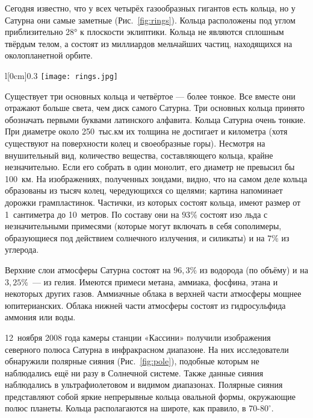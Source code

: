 \documentclass{article}
\begin{document}
    Сегодня известно, что у всех четырёх газообразных гигантов есть кольца, но у Сатурна они самые заметные (Рис.~\ref{fig:rings}). Кольца расположены под углом приблизительно 28° к плоскости эклиптики. Кольца не являются сплошным твёрдым телом, а состоят из миллиардов мельчайших частиц, находящихся на околопланетной орбите.\par
    \begin{wrapfigure}[14]{l}[0cm]{0.3\textwidth}
        \vspace{-0.5pc}
        \texttt{[image: rings.jpg]}
        \caption{}
        \label{fig:rings}
    \end{wrapfigure}
    Существует три основных кольца и четвёртое — более тонкое. Все вместе они отражают больше света, чем диск самого Сатурна. Три основных кольца принято обозначать первыми буквами латинского алфавита. Кольца Сатурна очень тонкие. При диаметре около 250~тыс.км их толщина не достигает и километра (хотя существуют на поверхности колец и своеобразные горы). Несмотря на внушительный вид, количество вещества, составляющего кольца, крайне незначительно. Если его собрать в один монолит, его диаметр не превысил бы 100~км. На изображениях, полученных зондами, видно, что на самом деле кольца образованы из тысяч колец, чередующихся со щелями; картина напоминает дорожки грампластинок. Частички, из которых состоят кольца, имеют размер от 1~сантиметра до 10~метров. По составу они на $93\%$ состоят изо льда с незначительными примесями (которые могут включать в себя сополимеры, образующиеся под действием солнечного излучения, и силикаты) и на $7\%$ из углерода.\par
    Верхние слои атмосферы Сатурна состоят на $96,3\%$ из водорода (по объёму) и на $3,25\%$~--- из гелия. Имеются примеси метана, аммиака, фосфина, этана и некоторых других газов. Аммиачные облака в верхней части атмосферы мощнее юпитерианских. Облака нижней части атмосферы состоят из гидросульфида аммония или воды.\par
    12~ноября 2008 года камеры станции «Кассини» получили изображения северного полюса Сатурна в инфракрасном диапазоне. На них исследователи обнаружили полярные сияния (Рис.~\ref{fig:pole}), подобные которым не наблюдались ещё ни разу в Солнечной системе. Также данные сияния наблюдались в ультрафиолетовом и видимом диапазонах. Полярные сияния представляют собой яркие непрерывные кольца овальной формы, окружающие полюс планеты. Кольца располагаются на широте, как правило, в 70-$80^{\circ}$.\par
\end{document}
